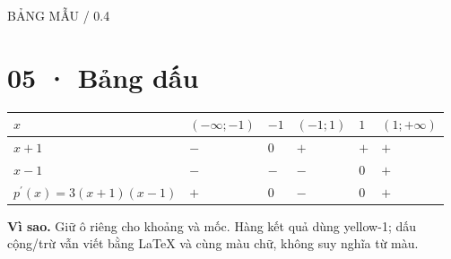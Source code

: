 \documentclass[11pt,a4paper]{article}
\newcommand{\tagline}[1]{{\small\color{muted}\MakeUppercase{#1}}\par}
\newcommand{\why}[1]{\par{\small\color{muted}\textbf{Vì sao.} #1}\par}
\begin{document}
\tagline{Bảng mẫu / 0.4}\section*{05 · Bảng dấu}
\begin{tabularx}{\linewidth}{|>{\raggedright\arraybackslash}p{.28\linewidth}|>{\centering\arraybackslash}X|>{\centering\arraybackslash}X|>{\centering\arraybackslash}X|>{\centering\arraybackslash}X|>{\centering\arraybackslash}X|}\hline
\rowcolor{head}$x$ & $(-\infty;-1)$ & $-1$ & $(-1;1)$ & $1$ & $(1;+\infty)$\\\hline
$x+1$ & $-$ & $0$ & $+$ & $+$ & $+$\\\hline
$x-1$ & $-$ & $-$ & $-$ & $0$ & $+$\\\hline
\rowcolor{focus}$p^{\prime}(x)=3(x+1)(x-1)$ & $+$ & $0$ & $-$ & $0$ & $+$\\\hline
\end{tabularx}\why{Giữ ô riêng cho khoảng và mốc. Hàng kết quả dùng yellow-1; dấu cộng/trừ vẫn viết bằng LaTeX và cùng màu chữ, không suy nghĩa từ màu.}
\end{document}
